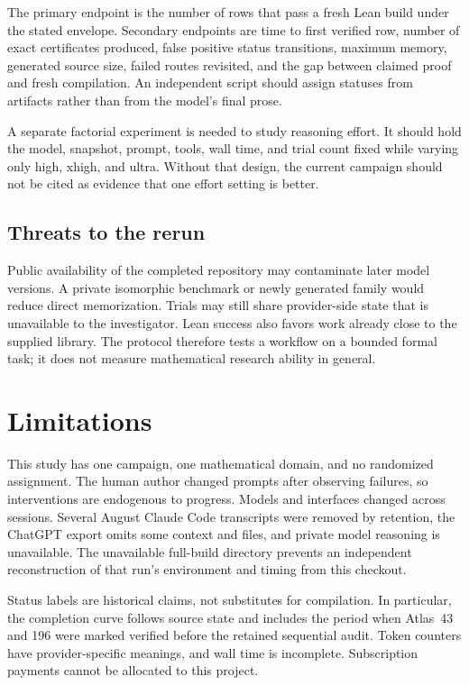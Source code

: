 \documentclass[11pt]{article}
\begin{document}
The primary endpoint is the number of rows that pass a fresh Lean build under
the stated envelope.  Secondary endpoints are time to first verified row,
number of exact certificates produced, false positive status transitions,
maximum memory, generated source size, failed routes revisited, and the gap
between claimed proof and fresh compilation.  An independent script should
assign statuses from artifacts rather than from the model's final prose.

A separate factorial experiment is needed to study reasoning effort.  It
should hold the model, snapshot, prompt, tools, wall time, and trial count
fixed while varying only high, xhigh, and ultra.  Without that design, the
current campaign should not be cited as evidence that one effort setting is
better.

\subsection{Threats to the rerun}

Public availability of the completed repository may contaminate later model
versions.  A private isomorphic benchmark or newly generated family would
reduce direct memorization.  Trials may still share provider-side state that
is unavailable to the investigator.  Lean success also favors work already
close to the supplied library.  The protocol therefore tests a workflow on a
bounded formal task; it does not measure mathematical research ability in
general.

\section{Limitations}
\label{sec:limitations}

This study has one campaign, one mathematical domain, and no randomized
assignment.  The human author changed prompts after observing failures, so
interventions are endogenous to progress.  Models and interfaces changed
across sessions.  Several August Claude Code transcripts were removed by
retention, the ChatGPT export omits some context and files, and private model
reasoning is unavailable.  The unavailable full-build directory prevents an
independent reconstruction of that run's environment and timing from this
checkout.

Status labels are historical claims, not substitutes for compilation.  In
particular, the completion curve follows source state and includes the period
when Atlas~43 and 196 were marked verified before the retained sequential
audit.  Token counters have provider-specific meanings, and wall time is
incomplete.  Subscription payments cannot be allocated to this project.
\end{document}
